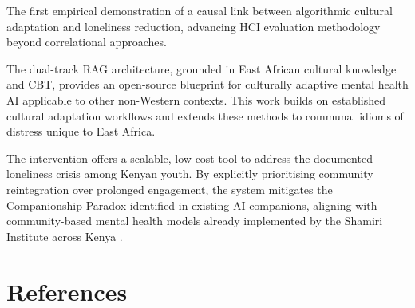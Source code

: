 \documentclass[12pt,a4paper]{article}
\begin{document}
\begin{description}[style=nextline]
  \item[Theoretical Contribution]
  The first empirical demonstration of a causal link between algorithmic cultural adaptation and loneliness reduction, advancing HCI evaluation methodology beyond correlational approaches.

  \item[Technical Contribution]
  The dual-track RAG architecture, grounded in East African cultural knowledge and CBT, provides an open-source blueprint for culturally adaptive mental health AI applicable to other non-Western contexts. This work builds on established cultural adaptation workflows \citep{Xie2025} and extends these methods to communal idioms of distress unique to East Africa.

  \item[Practical Contribution]
  The intervention offers a scalable, low-cost tool to address the documented loneliness crisis among Kenyan youth. By explicitly prioritising community reintegration over prolonged engagement, the system mitigates the Companionship Paradox identified in existing AI companions, aligning with community-based mental health models already implemented by the Shamiri Institute across Kenya \citep{Shamiri2025}.
\end{description}

\newpage
\section{References}
\renewcommand{\refname}{}
\end{document}
